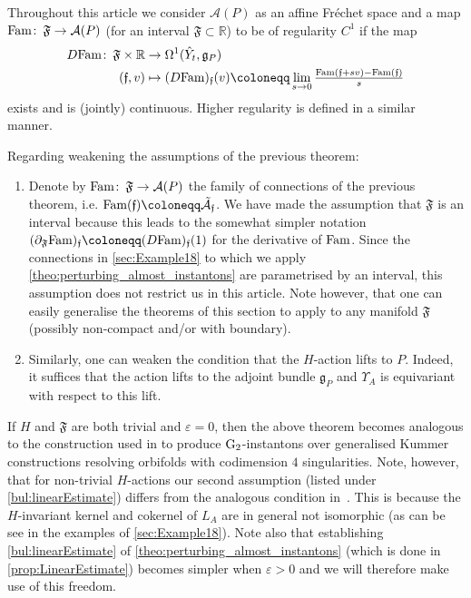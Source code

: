 \documentclass[11pt,a4paper]{scrartcl}
\newcommand{\col}{\colon \thinspace}
\newcommand{\G}{\textup{G}}
\numberwithin{equation}{section}
\theoremstyle{plain}
\theoremstyle{definition}
\theoremstyle{remark}
\begin{document}
\begin{remark}
Throughout this article we consider $\mathcal{A}(P)$ as an affine Fréchet space and a map $\textup{Fam} \col \mathfrak{F} \to \mathcal{A}(P)$ (for an interval $\mathfrak{F}\subset \mathbb{R}$) to be of regularity $C^1$ if the map 
\begin{align*}
D \textup{Fam} \col \mathfrak{F} \times \mathbb{R} &\to \Omega^1(\hat{Y}_t,\mathfrak{g}_P) \\
(\mathfrak{f},v) &\mapsto (D\textup{Fam})_\mathfrak{f}(v) \coloneqq \lim_{s \to 0} \tfrac{\textup{Fam}(\mathfrak{f}+s v)-\textup{Fam}(\mathfrak{f})}{s}
\end{align*}
exists and is (jointly) continuous. Higher regularity is defined in a similar manner.
\end{remark}
\begin{remark}\label{rem:perturbing almost instantons weakening assumptions}
Regarding weakening the assumptions of the previous theorem:
\begin{enumerate}
\item\label{bul: perturbing for general families} Denote by $\textup{Fam} \col \mathfrak{F} \to \mathcal{A}(P)$ the family of connections of the previous theorem, i.e. $\textup{Fam}(\mathfrak{f})\coloneqq \tilde{\mathcal{A}}_\mathfrak{f}$. We have made the assumption that $\mathfrak{F}$ is an interval because this leads to the somewhat simpler notation $(\partial_\mathfrak{F}\textup{Fam})_\mathfrak{f} \coloneqq (D\textup{Fam})_{\mathfrak{f}}(1)$ for the derivative of $\textup{Fam}$. Since the connections in \autoref{sec:Example18} to which we apply \autoref{theo:perturbing_almost_instantons} are parametrised by an interval, this assumption does not restrict us in this article. Note however, that one can easily generalise the theorems of this section to apply to any manifold $\mathfrak{F}$  (possibly non-compact and/or with boundary).
\item\label{bul: perturbing for more general H-actions}  Similarly, one can weaken the condition that the $H$-action lifts to $P$. Indeed, it suffices that the action lifts to the adjoint bundle $\mathfrak{g}_P$ and $\Upsilon_A$ is equivariant with respect to this lift.
\end{enumerate}
\end{remark}
\begin{remark}
If $H$ and $\mathfrak{F}$ are both trivial and $\varepsilon=0$, then the above theorem becomes analogous to the construction used in \cite{Walpuski-InstantonsKummer} to produce $\G_2$-instantons over generalised Kummer constructions resolving orbifolds with codimension $4$ singularities. Note, however, that for non-trivial $H$-actions our second assumption (listed under \autoref{bul:linearEstimate}) differs from the analogous condition in~\cite[Section~8]{Walpuski-InstantonsKummer}. This is because the $H$-invariant kernel and cokernel of $L_A$ are in general not isomorphic (as can be see in the examples of \autoref{sec:Example18}). Note also that establishing \autoref{bul:linearEstimate} of \autoref{theo:perturbing_almost_instantons} (which is done in \autoref{prop:LinearEstimate}) becomes simpler when $\varepsilon>0$ and we will therefore make use of this freedom. 
\end{remark}
\end{document}

